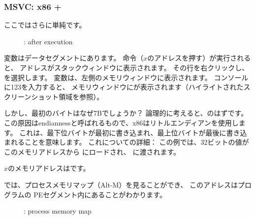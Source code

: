 \clearpage
\subsubsection{MSVC: x86 + \olly}
\myindex{\olly}

ここではさらに単純です。

\begin{figure}[H]
\centering
{}
\caption{\olly: after \scanf execution}
\label{fig:scanf_ex2_olly_1}
\end{figure}

変数はデータセグメントにあります。 
\PUSH 命令（$x$のアドレスを押す）が実行されると、
アドレスがスタックウィンドウに表示されます。 その行を右クリックし、を選択します。 
変数は、左側のメモリウィンドウに表示されます。 
コンソールに123を入力すると、
メモリウィンドウにが表示されます（ハイライトされたスクリーンショット領域を参照）。

しかし、最初のバイトはなぜ7Bでしょうか？ 
論理的に考えると、のはずです。 
この原因は\gls{endianness}と呼ばれるもので、x86はリトルエンディアンを使用します。 
これは、最下位バイトが最初に書き込まれ、最上位バイトが最後に書き込まれることを意味します。 
これについての詳細：
この例では、32ビットの値がこのメモリアドレスから \EAX にロードされ、 \printf に渡されます。

$x$のメモリアドレスはです。

\clearpage
\olly では、プロセスメモリマップ（Alt-M）を見ることができ、
このアドレスはプログラムの PEセグメント内にあることがわかります。

\label{olly_memory_map_example}
\begin{figure}[H]
\centering
{}
\caption{\olly: process memory map}
\label{fig:scanf_ex2_olly_2}
\end{figure}

